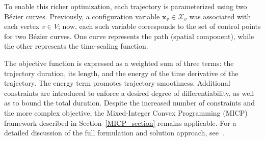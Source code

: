 To enable this richer optimization, each trajectory is parameterized using two B\'ezier curves. Previously, a configuration variable \(\mathbf{x}_v \in \mathcal{X}_v\) was associated with each vertex \(v \in V\); now, each such variable corresponds to the set of control points for two B\'ezier curves. One curve represents the path (spatial component), while the other represents the time-scaling function.

The objective function is expressed as a weighted sum of three terms: the trajectory duration, its length, and the energy of the time derivative of the trajectory. The energy term promotes trajectory smoothness. Additional constraints are introduced to enforce a desired degree of differentiability, as well as to bound the total duration. Despite the increased number of constraints and the more complex objective, the Mixed-Integer Convex Programming (MICP) framework described in Section~\ref{MICP_section} remains applicable. For a detailed discussion of the full formulation and solution approach, see~\cite{marcucci2023motion}.